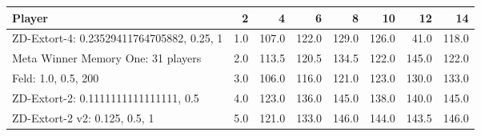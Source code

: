 \begin{tabular}{lrrrrrrr}
\toprule
                                    Player &    2 &      4 &      6 &      8 &     10 &     12 &     14 \\
\midrule
 ZD-Extort-4: 0.23529411764705882, 0.25, 1 &  1.0 &  107.0 &  122.0 &  129.0 &  126.0 &   41.0 &  118.0 \\
        Meta Winner Memory One: 31 players &  2.0 &  113.5 &  120.5 &  134.5 &  122.0 &  145.0 &  122.0 \\
                       Feld: 1.0, 0.5, 200 &  3.0 &  106.0 &  116.0 &  121.0 &  123.0 &  130.0 &  133.0 \\
      ZD-Extort-2: 0.1111111111111111, 0.5 &  4.0 &  123.0 &  136.0 &  145.0 &  138.0 &  140.0 &  145.0 \\
             ZD-Extort-2 v2: 0.125, 0.5, 1 &  5.0 &  121.0 &  133.0 &  146.0 &  144.0 &  143.5 &  146.0 \\
\bottomrule
\end{tabular}
